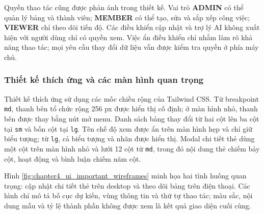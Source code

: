 \documentclass[../DoAn.tex]{subfiles}
\begin{document}
Quyền thao tác cũng được phản ánh trong thiết kế. Vai trò \textbf{ADMIN} có thể quản lý bảng và thành viên; \textbf{MEMBER} có thể tạo, sửa và sắp xếp công việc; \textbf{VIEWER} chỉ theo dõi tiến độ. Các điều khiển cập nhật và trợ lý AI không xuất hiện với người dùng chỉ có quyền xem. Việc ẩn điều khiển chỉ nhằm làm rõ khả năng thao tác; mọi yêu cầu thay đổi dữ liệu vẫn được kiểm tra quyền ở phía máy chủ.

\subsubsection{Thiết kế thích ứng và các màn hình quan trọng}

Thiết kế thích ứng sử dụng các mốc chiều rộng của Tailwind CSS. Từ breakpoint \texttt{md}, thanh bên tổ chức rộng 256 px được hiển thị cố định; ở màn hình nhỏ, thanh bên được thay bằng nút mở menu. Danh sách bảng thay đổi từ hai cột lên ba cột tại \texttt{sm} và bốn cột tại \texttt{lg}. Tên chế độ xem được ẩn trên màn hình hẹp và chỉ giữ biểu tượng; từ \texttt{lg}, cả biểu tượng và nhãn được hiển thị. Modal chi tiết thẻ dùng một cột trên màn hình nhỏ và lưới 12 cột từ \texttt{md}, trong đó nội dung thẻ chiếm bảy cột, hoạt động và bình luận chiếm năm cột.

Hình \ref{fig:chapter4_ui_important_wireframes} minh họa hai tình huống quan trọng: cập nhật chi tiết thẻ trên desktop và theo dõi bảng trên điện thoại. Các hình chỉ mô tả bố cục dự kiến, vùng thông tin và thứ tự thao tác; màu sắc, nội dung mẫu và tỷ lệ thành phần không được xem là kết quả giao diện cuối cùng.
\end{document}

